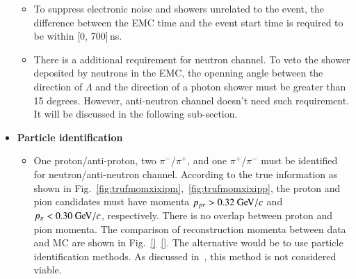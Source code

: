 \begin{itemize}
\begin{itemize}
\item  To suppress electronic noise and showers unrelated to the event, the difference between the EMC time and the event start time is required to be within 
[0, 700]\,ns.

\item 
	There is a additional requirement for neutron channel. To veto the shower deposited by 
	neutrons in the EMC, the openning angle between the direction of $\Lambda$ and the 
		direction of a photon shower must be greater than 15 degrees. However, 
		anti-neutron channel doesn't need such requirement. It will be discussed in the following 
		sub-section.
\end{itemize}

\item {\bf Particle identification}
	\begin{itemize}
		\item  One proton/anti-proton, two $\pi^-$/$\pi^+$, and one $\pi^+$/$\pi^-$ must be identified 
			for neutron/anti-neutron channel. According to the true information as shown in Fig.~\ref{fig:trufmomxixipm},~\ref{fig:trufmomxixipp},
			the proton and pion candidates must have momenta
			$p_{pr} > 0.32 \GeV/c$ and $p_{\pi} < 0.30 \GeV/c$, respectively.
			There is no overlap between proton and pion momenta. The comparison
			of reconstruction momenta between data and MC are shown in
			Fig.~\ref{}~\ref{}.
			The alternative would be to use particle identification methods. 
			As discussed in~\cite{}, this method is not considered viable.
	\end{itemize}

\end{itemize}
